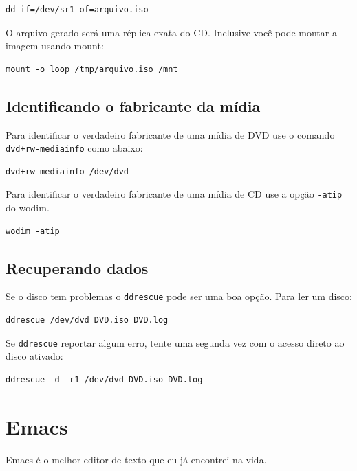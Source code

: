 \documentclass[12pt,brazil]{book}
\begin{document}
\begin{verbatim}
dd if=/dev/sr1 of=arquivo.iso
\end{verbatim}

O arquivo gerado será uma réplica exata do CD. Inclusive você pode
montar a imagem usando mount:

\begin{verbatim}
mount -o loop /tmp/arquivo.iso /mnt
\end{verbatim}

\section{Identificando o fabricante da mídia}
\label{sec:ident-o-fabr}

Para identificar o verdadeiro fabricante de uma mídia de DVD use o
comando \texttt{dvd+rw-mediainfo} como abaixo:

\begin{verbatim}
dvd+rw-mediainfo /dev/dvd
\end{verbatim}

Para identificar o verdadeiro fabricante de uma mídia de CD use a
opção \texttt{-atip} do wodim.

\begin{verbatim}
wodim -atip 
\end{verbatim}

\section{Recuperando dados}
\label{sec:recuperando-dados}

Se o disco tem problemas o \texttt{ddrescue} pode ser uma boa opção.
Para ler um disco:

\begin{verbatim}
ddrescue /dev/dvd DVD.iso DVD.log
\end{verbatim}

Se \texttt{ddrescue} reportar algum erro, tente uma segunda vez com o
acesso direto ao disco ativado:

\begin{verbatim}
ddrescue -d -r1 /dev/dvd DVD.iso DVD.log
\end{verbatim}

\chapter{Emacs}
\label{cha:emacs}

Emacs é o melhor editor de texto que eu já encontrei na vida.
\end{document}
